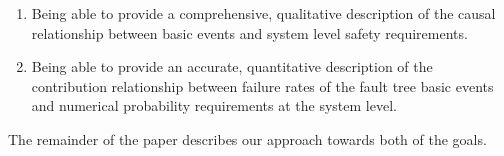 \begin{enumerate}
	\item Being able to provide a comprehensive, qualitative description of the causal relationship between basic events and system level safety requirements.
	\item Being able to provide an accurate, quantitative description of the contribution relationship between failure rates of the fault tree basic events and numerical probability requirements at the system level.
\end{enumerate}

The remainder of the paper describes our approach towards both of the goals.



